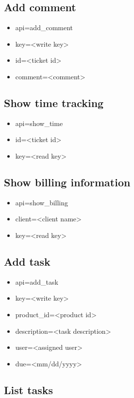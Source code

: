 \documentclass[11pt]{article}
\begin{document}
\subsection{Add comment}

\begin{itemize}
\item api=add\_comment
\item key=<write key>
\item id=<ticket id>
\item comment=<comment>
\end{itemize}

\subsection{Show time tracking}

\begin{itemize}
\item api=show\_time
\item id=<ticket id>
\item key=<read key>
\end{itemize}

\subsection{Show billing information}

\begin{itemize}
\item api=show\_billing
\item client=<client name>
\item key=<read key>
\end{itemize}

\subsection{Add task}

\begin{itemize}
\item api=add\_task
\item key=<write key>
\item product\_id=<product id>
\item description=<task description>
\item user=<assigned user>
\item due=<mm/dd/yyyy>
\end{itemize}

\subsection{List tasks}
\end{document}
